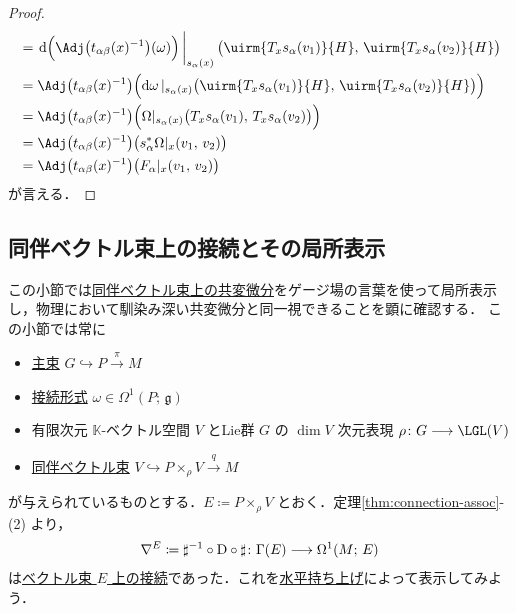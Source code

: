 \documentclass[TQFT_main]{subfiles}
\begin{document}
\begin{proof}
\begin{align}
        &= \eval{\dd{\Bigl(\Adj \bigl( t_{\alpha\beta}(x)^{-1} \bigr)(\omega) \Bigr)}}_{s_\alpha(x)} \bigl( \uirm{T_x s_\alpha(v_1)}{H},\, \uirm{T_x s_\alpha(v_2)}{H} \bigr) \\
        &= \Adj \bigl( t_{\alpha\beta}(x)^{-1} \bigr) \Bigl(\dd{\omega}|_{s_\alpha(x)} \bigl( \uirm{T_x s_\alpha(v_1)}{H},\, \uirm{T_x s_\alpha(v_2)}{H} \bigr)\Bigr) \\
        &= \Adj \bigl( t_{\alpha\beta}(x)^{-1} \bigr) \Bigl(\Omega|_{s_\alpha(x)} \bigl( T_x s_\alpha(v_1),\, T_x s_\alpha(v_2) \bigr)\Bigr) \\
        &= \Adj \bigl( t_{\alpha\beta}(x)^{-1} \bigr) \bigl(s_\alpha^*\Omega|_x(v_1,\, v_2)\bigr) \\
        &= \Adj \bigl( t_{\alpha\beta}(x)^{-1} \bigr) \bigl(F_\alpha|_x(v_1,\, v_2)\bigr)
    \end{align}
    が言える．
\end{proof}

\subsection{同伴ベクトル束上の接続とその局所表示}

この小節では\hyperref[thm:connection-assoc]{同伴ベクトル束上の共変微分}をゲージ場の言葉を使って局所表示し，物理において馴染み深い共変微分と同一視できることを顕に確認する．
この小節では常に
\begin{itemize}
    \item \hyperref[def.PFD]{主束} $G \hookrightarrow P \xrightarrow{\pi} M$
    \item \hyperref[def:connection]{接続形式} $\omega \in \Omega^1(P;\, \mathfrak{g})$
    \item 有限次元 $\mathbb{K}$-ベクトル空間 $V$ とLie群 $G$ の $\dim V$ 次元表現 $\rho \colon G \lto \LGL (V)$ 
    \item \hyperref[def:associated-vect]{同伴ベクトル束} $V \hookrightarrow P \times_\rho V \xrightarrow{q} M$
\end{itemize}
が与えられているものとする．$E \coloneqq P \times_\rho V$ とおく．定理\ref{thm:connection-assoc}-(2) より，
\begin{align}
    \nabla^E \coloneqq \sharp^{-1} \circ \mathrm{D} \circ \sharp \colon \Gamma(E) \longrightarrow \Omega^1(M;\, E)
\end{align}
は\hyperref[def:connection-vect]{ベクトル束 $E$ 上の接続}であった．これを\hyperref[def:horizontal-lift-curve]{水平持ち上げ}によって表示してみよう．
\end{document}
